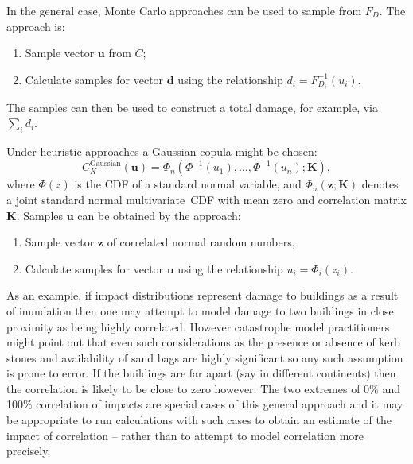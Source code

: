 \documentclass[a4paper,11pt]{extarticle} %
\theoremstyle{definition}
\begin{document}
In the general case, Monte Carlo approaches can be used to sample from $F_D$. The approach is:

\begin{enumerate}[]
    \item Sample vector $\mathbf{u}$ from $C$;
    \item Calculate samples for vector $\mathbf{d}$ using the relationship $d_i = F_{D_i}^{-1}(u_i)$.
\end{enumerate}

The samples can then be used to construct a total damage, for example, via $\sum_i d_i$.

Under heuristic approaches a Gaussian copula might be chosen:
\begin{equation}
    \label{Eq:CopulaGaussian}
    C^{\text{Gaussian}}_K(\mathbf{u}) = \Phi_n(\Phi^{-1}(u_1), \dots, \Phi^{-1}(u_n);\mathbf{K}),
\end{equation}
where $\Phi(z)$ is the CDF of a standard normal variable, and $\Phi_n(\mathbf{z}; \mathbf{K})$ denotes a joint standard normal multivariate~CDF with mean zero and correlation matrix $\mathbf{K}$. Samples $\mathbf{u}$ can be obtained by the approach:

\begin{enumerate}[]
    \item Sample vector $\mathbf{z}$ of correlated normal random numbers,
    \item Calculate samples for vector $\mathbf{u}$ using the relationship $u_i = \Phi_i(z_i)$.
\end{enumerate}

As an example, if impact distributions represent damage to buildings as a result of inundation then one may attempt to model damage to two buildings in close proximity as being highly correlated. However catastrophe model practitioners might point out that even such considerations as the presence or absence of kerb stones and availability of sand bags are highly significant so any such assumption is prone to error. If the buildings are far apart (say in different continents) then the correlation is likely to be close to zero however. The two extremes of 0\% and 100\% correlation of impacts are special cases of this general approach and it may be appropriate to run calculations with such cases to obtain an estimate of the impact of correlation -- rather than to attempt to model correlation more precisely.
\end{document}
